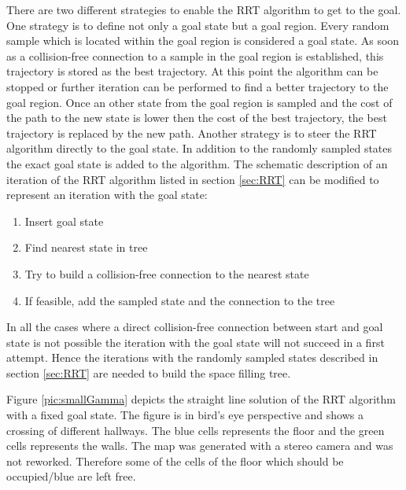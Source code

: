 There are two different strategies to enable the RRT algorithm to get to the goal. One strategy is to define not only a goal state but a goal region. Every random sample which is located within the goal region is considered a goal state. As soon as a collision-free connection to a sample in the goal region is established, this trajectory is stored as the best trajectory. At this point the algorithm can be stopped or further iteration can be performed to find a better trajectory to the goal region. Once an other state from the goal region is sampled and the cost of the path to the new state is lower then the cost of the best trajectory, the best trajectory is replaced by the new path. \newline
Another strategy is to steer the RRT algorithm directly to the goal state. In addition to the randomly sampled states the exact goal state is added to the algorithm. The schematic description of an iteration of the RRT algorithm listed in section \ref{sec:RRT} can be modified to represent an iteration with the goal state:

\begin{enumerate}
  \item Insert goal state
  \item Find nearest state in tree
  \item Try to build a collision-free connection to the nearest state
  \item If feasible, add the sampled state and the connection to the tree
\end{enumerate}

In all the cases where a direct collision-free connection between start and goal state is not possible the iteration with the goal state will not succeed in a first attempt. Hence the iterations with the randomly sampled states described in section \ref{sec:RRT} are needed to build the space filling tree.\newline

Figure \ref{pic:smallGamma} depicts the straight line solution of the RRT algorithm with a fixed goal state. The figure is in bird's eye perspective and shows a crossing of different hallways. The blue cells represents the floor and the green cells represents the walls. The map was generated with a stereo camera and was not reworked. Therefore some of the cells of the floor which should be occupied/blue are left free. 

